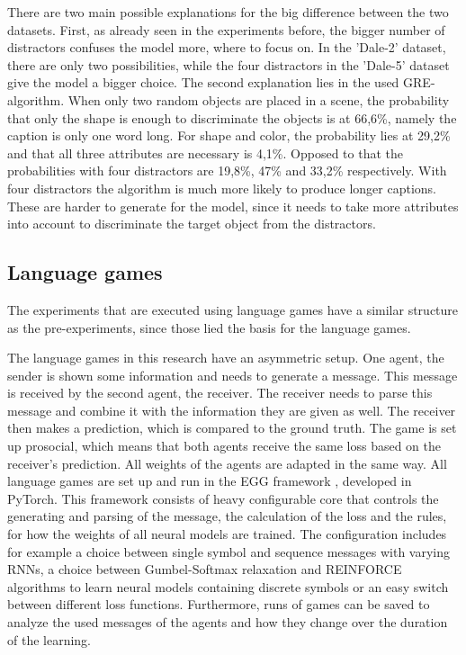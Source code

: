 There are two main possible explanations for the big difference between the two datasets.
First, as already seen in the experiments before, the bigger number of distractors confuses the model more, where to focus on.
In the 'Dale-2' dataset, there are only two possibilities, while the four distractors in the 'Dale-5' dataset give the model a bigger choice.
The second explanation lies in the used GRE-algorithm.
When only two random objects are placed in a scene, the probability that only the shape is enough to discriminate the objects is at 66,6\%, namely the caption is only one word long.
For shape and color, the probability lies at 29,2\% and that all three attributes are necessary is 4,1\%.
Opposed to that the probabilities with four distractors are 19,8\%, 47\% and 33,2\% respectively.
With four distractors the algorithm is much more likely to produce longer captions.
These are harder to generate for the model, since it needs to take more attributes into account to discriminate the target object from the distractors.

\subsection{Language games}
The experiments that are executed using language games have a similar structure as the pre-experiments, since those lied the basis for the language games.

The language games in this research have an asymmetric setup.
One agent, the sender is shown some information and needs to generate a message.
This message is received by the second agent, the receiver.
The receiver needs to parse this message and combine it with the information they are given as well.
The receiver then makes a prediction, which is compared to the ground truth.
The game is set up prosocial, which means that both agents receive the same loss based on the receiver's prediction.
All weights of the agents are adapted in the same way.
All language games are set up and run in the EGG framework \citep{Kharitonov2019}, developed in PyTorch.
This framework consists of heavy configurable core that controls the generating and parsing of the message, the calculation of the loss and the rules, for how the weights of all neural models are trained.
The configuration includes for example a choice between single symbol and sequence messages with varying RNNs, a choice between Gumbel-Softmax relaxation and REINFORCE algorithms to learn neural models containing discrete symbols or an easy switch between different loss functions.
Furthermore, runs of games can be saved to analyze the used messages of the agents and how they change over the duration of the learning.

